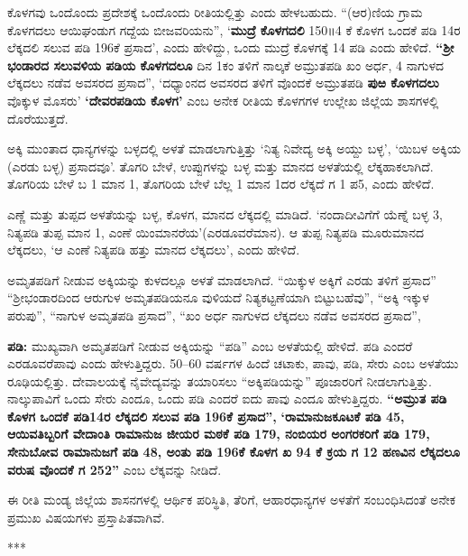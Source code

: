 ಕೊಳಗವು ಒಂದೊಂದು ಪ್ರದೇಶಕ್ಕೆ ಒಂದೊಂದು ರೀತಿಯಲ್ಲಿತ್ತು ಎಂದು ಹೇಳಬಹುದು. “(ಆರ)ಣಿಯ ಗ್ರಾಮ ಕೊಳಗದಲು ಆಯಿಘಂಡುಗ ಗದ್ದೆಯ ಬೀಜವರಿಯನು”, ‘\textbf{ಮುದ್ರೆ ಕೊಳಗದಲಿ} 150॥4 ಕೆ ಕೊಳಗ ಒಂದಕೆ ಪಡಿ 14ರ ಲೆಕ್ಕದಲಿ ಸಲುವ ಪಡಿ 196ಕೆ ಪ್ರಸಾದ’, ಎಂದು ಹೇಳಿದ್ದು, ಒಂದು ಮುದ್ರೆ ಕೊಳಗಕ್ಕೆ 14 ಪಡಿ ಎಂದು ಹೇಳಿದೆ. \textbf{“ಶ‍್ರೀ} \textbf{ಭಂಡಾರದ ಸಲುವಳಿಯ ಪಡಿಯ ಕೊಳಗದಲೂ} ದಿನ 1ಕಂ ತಳಿಗೆ ನಾಲ್ಕಕೆ ಅಮ್ರುತಪಡಿ ಖಂ ಅರ್ಧ, 4 ನಾಗುಳದ ಲೆಕ್ಕದಲು ನಡೆವ ಅವಸರದ ಪ್ರಸಾದ”, ‘ದಧ್ಯಾಂನದ ಅವಸರದ ತಳಿಗೆ ವೊಂದಕೆ ಅಮ್ರುತಪಡಿ \textbf{ಪುಱ ಕೊಳಗದಲು} ವೊಕ್ಕುಳ ಮೊಸರು’ \textbf{‘ದೇವರಪಡಿಯ ಕೊಳಗ’} ಎಂಬ ಅನೇಕ ರೀತಿಯ ಕೊಳಗಗಳ ಉಲ್ಲೇಖ ಜಿಲ್ಲೆಯ ಶಾಸಗಳಲ್ಲಿ ದೊರೆಯುತ್ತದೆ.

ಅಕ್ಕಿ ಮುಂತಾದ ಧಾನ್ಯಗಳನ್ನು ಬಳ್ಳದಲ್ಲಿ ಅಳತೆ ಮಾಡಲಾಗುತ್ತಿತ್ತು ‘ನಿತ್ಯ ನಿವೇದ್ಯ ಅಕ್ಕಿ ಅಯ್ದು ಬಳ್ಳ’, ‘ಯಿಬಳ ಅಕ್ಕಿಯ (ಎರಡು ಬಳ್ಳ) ಪ್ರಸಾದವೂ’. ತೊಗರಿ ಬೇಳೆ, ಉಪ್ಪುಗಳನ್ನು ಬಳ್ಳ ಮತ್ತು ಮಾನದ ಅಳತೆಯಲ್ಲಿ ಲೆಕ್ಕಹಾಕಲಾಗಿದೆ. ತೊಗರಿಯ ಬೇಳೆ ಬ 1 ಮಾನ 1, ತೊಗರಿಯ ಬೇಳೆ ಬೆಲ್ಲ 1 ಮಾನ 1ದರ ಲೆಕ್ಕದೆ ಗ 1 ಪ5, ಎಂದು ಹೇಳಿದೆ.

ಎಣ್ಣೆ ಮತ್ತು ತುಪ್ಪದ ಅಳತೆಯನ್ನು ಬಳ್ಳ, ಕೊಳಗ, ಮಾನದ ಲೆಕ್ಕದಲ್ಲಿ ಮಾಡಿದೆ. ‘ನಂದಾದೀವಿಗೆಗೆ ಯೆಣ್ನೆ ಬಳ್ಳ 3, ನಿತ್ಯಪಡಿ ತುಪ್ಪ ಮಾನ 1, ಎಂಣೆ ಯಿಂಮಾನರೆಯ’(ಎರಡೂವರೆಮಾನ). ಆ ತುಪ್ಪ ನಿತ್ಯಪಡಿ ಮೂರುಮಾನದ ಲೆಕ್ಕದಲು, ‘ಆ ಎಂಣೆ ನಿತ್ಯಪಡಿ ಹತ್ತು ಮಾನದ ಲೆಕ್ಕದಲು’, ಎಂದು ಹೇಳಿದೆ.

ಅಮೃತಪಡಿಗೆ ನೀಡುವ ಅಕ್ಕಿಯನ್ನು ಕುಳದಲ್ಲೂ ಅಳತೆ ಮಾಡಲಾಗಿದೆ. “ಯಿಕ್ಕುಳ ಅಕ್ಕಿಗೆ ಎರಡು ತಳಿಗೆ ಪ್ರಸಾದ” “ಶ‍್ರೀಭಂಡಾರದಿಂದ ಆರುಗುಳ ಅಮೃತಪಡಿಯನೂ ವುಳಿಯದೆ ನಿತ್ಯಕಟ್ಟಣೆಯಾಗಿ ಬಿಟ್ಟುಬಹೆವು”, “ಅಕ್ಕಿ ಇಕ್ಕುಳ ಪರುಪು”, “ನಾಗುಳ ಅಮೃತಪಡಿ ಪ್ರಸಾದ”, “ಖಂ ಅರ್ಧ ನಾಗುಳದ ಲೆಕ್ಕದಲು ನಡೆವ ಅವಸರದ ಪ್ರಸಾದ”,

\textbf{ಪಡಿ:} ಮುಖ್ಯವಾಗಿ ಅಮೃತಪಡಿಗೆ ನೀಡುವ ಅಕ್ಕಿಯನ್ನು “ಪಡಿ” ಎಂಬ ಅಳತೆಯಲ್ಲಿ ಹೇಳಿದೆ. ಪಡಿ ಎಂದರೆ ಎರಡೂವರೆಪಾವು ಎಂದು ಹೇಳುತ್ತಿದ್ದರು. 50–60 ವರ್ಷಗಳ ಹಿಂದೆ ಚಟಾಕು, ಪಾವು, ಪಡಿ, ಸೇರು ಎಂಬ ಅಳತೆಯು ರೂಢಿಯಲ್ಲಿತ್ತು. ದೇವಾಲಯಕ್ಕೆ ನೈವೇದ್ಯವನ್ನು ತಯಾರಿಸಲು “ಅಕ್ಕಿಪಡಿಯನ್ನು” ಪೂಜಾರರಿಗೆ ನೀಡಲಾಗುತ್ತಿತ್ತು. ನಾಲ್ಕುಪಾವಿಗೆ ಒಂದು ಸೇರು ಎಂದೂ, ಒಂದು ಪಡಿ ಎಂದರೆ ಐದು ಪಾವು ಎಂದೂ ಹೇಳುತ್ತಿದ್ದರು. \textbf{“ಅಮ್ರುತ ಪಡಿ ಕೊಳಗ ಒಂದಕೆ ಪಡಿ14ರ ಲೆಕ್ಕದಲಿ ಸಲುವ ಪಡಿ 196ಕೆ ಪ್ರಸಾದ”,} \textbf{‘ರಾಮಾನುಜಕೂಟಕೆ ಪಡಿ 45, ಆಯಿವತಿಬ್ಬರಿಗೆ ವೇದಾಂತಿ ರಾಮಾನುಜ ಜೀಯರ ಮಠಕೆ ಪಡಿ 179, ನಂಬಿಯರ ಅಂಗರಕರಿಗೆ ಪಡಿ 179, ಸೇನುಬೋವ ರಾಮಾನುಜಗೆ ಪಡಿ 48, ಅಂತು ಪಡಿ 196ಕೆ ಕೊಳಗ ಖ 94 ಕೆ ಕ್ರಯ ಗ 12 ಹಣವಿನ ಲೆಕ್ಕದಲೂ ವರುಷ ವೊಂದಕೆ ಗ 252”} ಎಂಬ ಲೆಕ್ಕವನ್ನು ನೀಡಿದೆ.

ಈ ರೀತಿ ಮಂಡ್ಯ ಜಿಲ್ಲೆಯ ಶಾಸನಗಳಲ್ಲಿ ಆರ್ಥಿಕ ಪರಿಸ್ಥಿತಿ, ತೆರಿಗೆ, ಆಹಾರಧಾನ್ಯಗಳ ಅಳತೆಗೆ ಸಂಬಂಧಿಸಿದಂತೆ ಅನೇಕ ಪ್ರಮುಖ ವಿಷಯಗಳು ಪ್ರಸ್ತಾಪಿತವಾಗಿವೆ.

\begin{center}
***
\end{center}

\theendnotes


